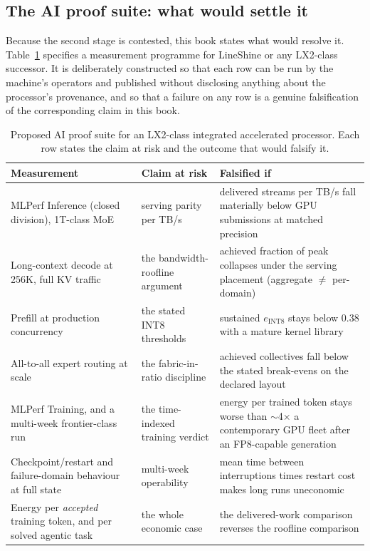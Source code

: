 \subsection{The AI proof suite: what would settle it}
\label{sec:proofsuite}

Because the second stage is contested, this book states what would resolve it. Table~\ref{tab:proofsuite} specifies a measurement programme for LineShine or any LX2-class successor. It is deliberately constructed so that each row can be run by the machine's operators and published without disclosing anything about the processor's provenance, and so that a failure on any row is a genuine falsification of the corresponding claim in this book.

\begin{table}[htbp]
  \centering
  \small
  \caption{Proposed AI proof suite for an LX2-class integrated accelerated processor. Each row states the claim at risk and the outcome that would falsify it.}
  \label{tab:proofsuite}
  \begin{tabular}{p{40mm}p{50mm}p{52mm}}
    \toprule
    Measurement & Claim at risk & Falsified if \\
    \midrule
    MLPerf Inference (closed division), 1T-class MoE & serving parity per TB/s & delivered streams per TB/s fall materially below GPU submissions at matched precision \\
    \addlinespace
    Long-context decode at 256K, full KV traffic & the bandwidth-roofline argument & achieved fraction of peak collapses under the serving placement (aggregate $\ne$ per-domain) \\
    \addlinespace
    Prefill at production concurrency & the stated INT8 thresholds & sustained $e_{\text{INT8}}$ stays below 0.38 with a mature kernel library \\
    \addlinespace
    All-to-all expert routing at scale & the fabric-in-ratio discipline & achieved collectives fall below the stated break-evens on the declared layout \\
    \addlinespace
    MLPerf Training, and a multi-week frontier-class run & the time-indexed training verdict & energy per trained token stays worse than $\sim$4$\times$ a contemporary GPU fleet after an FP8-capable generation \\
    \addlinespace
    Checkpoint/restart and failure-domain behaviour at full state & multi-week operability & mean time between interruptions times restart cost makes long runs uneconomic \\
    \addlinespace
    Energy per \emph{accepted} training token, and per solved agentic task & the whole economic case & the delivered-work comparison reverses the roofline comparison \\
    \bottomrule
  \end{tabular}
\end{table}


